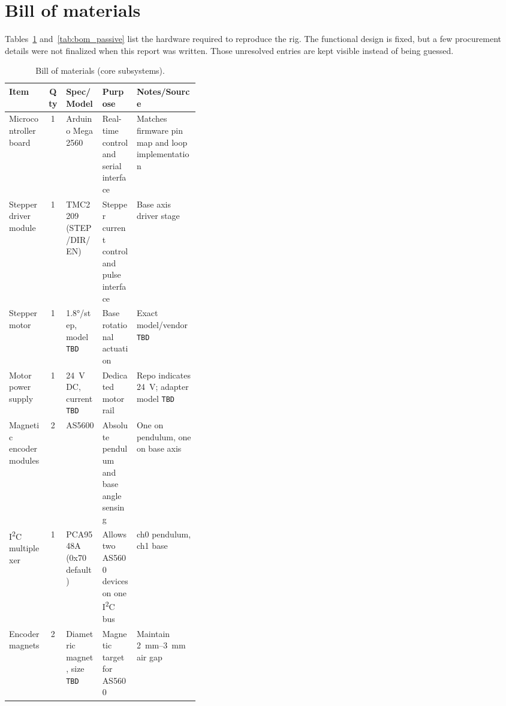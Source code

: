 \section{Bill of materials}
\label{sec:bom}
Tables~\ref{tab:bom} and~\ref{tab:bom_passive} list the hardware required to reproduce the rig. The functional design is fixed, but a few procurement details were not finalized when this report was written. Those unresolved entries are kept visible instead of being guessed.

\begin{table}[htbp]
  \centering
  \small
  \setlength{\tabcolsep}{4pt}
  \caption{Bill of materials (core subsystems).}
  \label{tab:bom}
  \begin{tabularx}{\linewidth}{@{}l c p{0.19\linewidth} p{0.18\linewidth} X@{}}
    \toprule
    Item & Qty & Spec/Model & Purpose & Notes/Source \\
    \midrule
    Microcontroller board & 1 & Arduino Mega 2560 & Real-time control and serial interface & Matches firmware pin map and loop implementation \\
    Stepper driver module & 1 & TMC2209 (STEP/DIR/EN) & Stepper current control and pulse interface & Base axis driver stage \\
    Stepper motor & 1 & 1.8\si{\degree}/step, model \texttt{TBD} & Base rotational actuation & Exact model/vendor \texttt{TBD} \\
    Motor power supply & 1 & \SI{24}{V} DC, current \texttt{TBD} & Dedicated motor rail & Repo indicates \SI{24}{V}; adapter model \texttt{TBD} \\
    Magnetic encoder modules & 2 & AS5600 & Absolute pendulum and base angle sensing & One on pendulum, one on base axis \\
    I\textsuperscript{2}C multiplexer & 1 & PCA9548A (0x70 default) & Allows two AS5600 devices on one I\textsuperscript{2}C bus & ch0 pendulum, ch1 base \\
    Encoder magnets & 2 & Diametric magnet, size \texttt{TBD} & Magnetic target for AS5600 & Maintain \SIrange{2}{3}{mm} air gap \\
    \bottomrule
  \end{tabularx}
\end{table}

